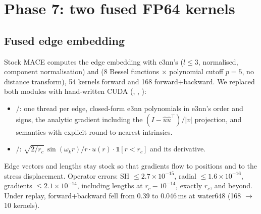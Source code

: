 \section{Phase 7: two fused FP64 kernels}
\label{sec:fusion}

\subsection{Fused edge embedding}
Stock MACE computes the edge embedding with e3nn's  ($l\le3$, normalised, component normalisation) and  (8 Bessel functions $\times$ polynomial cutoff $p=5$, no distance transform), 54 kernels forward and 168 forward+backward. We replaced both modules with hand-written CUDA (, , ):
\begin{itemize}
  \item {}/: one thread per edge, closed-form e3nn polynomials in e3nn's order and signs, the analytic gradient including the $(I-\hat u\hat u^\top)/|v|$ projection, and  semantics with explicit round-to-nearest intrinsics.
  \item {}/: $\sqrt{2/r_c}\,\sin(\omega_k r)/r\cdot u(r)\cdot\mathbb 1[r<r_c]$ and its derivative.
\end{itemize}
Edge vectors and lengths stay stock so that gradients flow to positions and to the stress displacement. Operator errors: SH $\le2.7\times10^{-15}$, radial $\le1.6\times10^{-16}$, gradients $\le2.1\times10^{-14}$, including lengths at $r_c-10^{-14}$, exactly $r_c$, and beyond. Under replay, forward+backward fell from 0.39 to 0.046\,ms at water648 (168 $\to$ 10 kernels).

